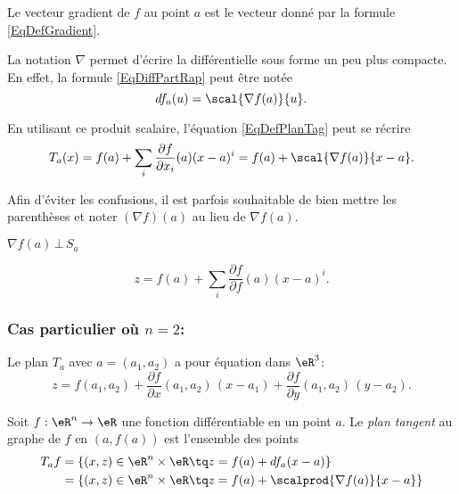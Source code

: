 \begin{definition}
	Le vecteur gradient de \( f\) au point \( a\) est le vecteur donné par la formule \eqref{EqDefGradient}.
\end{definition}
La notation \( \nabla\) permet d'écrire la différentielle sous forme un peu plus compacte. En effet, la formule \eqref{EqDiffPartRap} peut être notée
\begin{equation}
	df_a(u)=\scal{\nabla f(a)}{u}.
\end{equation}

En utilisant ce produit scalaire, l'équation \eqref{EqDefPlanTag} peut se récrire
\begin{equation}
	T_a(x)=f(a)+\sum_i\frac{ \partial f }{ \partial x_i }(a)(x-a)^i=f(a)+\scal{\nabla f(a)}{x-a}.
\end{equation}

Afin d'éviter les confusions, il est parfois souhaitable de bien mettre les parenthèses et noter \( (\nabla f)(a)\) au lieu de \( \nabla f(a)\).

\begin{proposition}
	\( \nabla f(a)\,\bot \,S_a\)
\end{proposition}


\begin{equation}        \label{EqPlanTgSansNabla}
	z=f(a)+\sum_i\frac{ \partial f }{ \partial f }(a)(x-a)^i.
\end{equation}

\subsubsection*{Cas particulier où \( n=2\):}
Le plan \( T_a\) avec \( a=(a_1,a_2)\) a pour équation dans \( \eR^3\):
\begin{equation}        \label{EqPlanTgEnDimDeux}
	z = f(a_1,a_2) + \frac{\partial f}{\partial x}(a_1,a_2)\,(x-a_1)+ \frac{\partial f}{\partial y}(a_1,a_2)\,(y-a_2).
\end{equation}

\begin{definition}
	Soit \( f : \eR^n \to\eR\) une fonction différentiable en un point
	\( a\). Le \emph{plan tangent} au graphe de \( f\) en \( (a,f(a))\) est
	l'ensemble des points
	\begin{equation*}
		\begin{split}
			T_af &= \{ (x,z) \in \eR^n \times \eR \tq z = f(a) + d f_a (x-a)\}\\
			&= \{ (x,z) \in \eR^n \times \eR \tq z = f(a) + \scalprod{\nabla f(a)}{x-a}\}
		\end{split}
	\end{equation*}
\end{definition}

